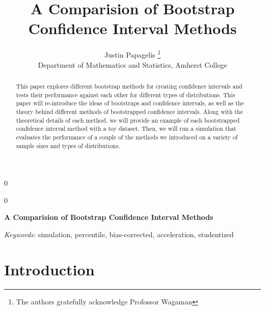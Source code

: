 \documentclass[12pt]{article}
\newcommand{\blind}{0}
\begin{document}
\def\spacingset#1{\renewcommand{\baselinestretch}%
{#1}\small\normalsize} \spacingset{1}



\blind
{
  \title{\bf A Comparision of Bootstrap Confidence Interval Methods}

  \author{
        Justin Papagelis \thanks{The authors gratefully acknowledge
Profossor Wagaman} \\
    Department of Mathematics and Statistics, Amherst College\\
      }
  \maketitle
} \fi

\blind
{
  \bigskip
  \bigskip
  \bigskip
  \begin{center}
    {\LARGE\bf A Comparision of Bootstrap Confidence Interval Methods}
  \end{center}
  \medskip
} \fi

\bigskip
\begin{abstract}
This paper explores different bootstrap methods for creating confidence
intervals and tests their performance against each other for different
types of distributions. This paper will re-introduce the ideas of
bootstraps and confidence intervals, as well as the theory behind
different methods of bootstrapped confidence intervals. Along with the
theoretical details of each method, we will provide an example of each
bootstrapped confidence interval method with a toy dataset. Then, we
will run a simulation that evaluates the performance of a couple of the
methods we introduced on a variety of sample sizes and types of
distributions.
\end{abstract}

\noindent%
{\it Keywords:} simulation, percentile, bias-corrected, acceleration, studentized
\vfill

\newpage
\spacingset{1.45} %

\hypertarget{introduction}{%
\section{Introduction}\label{introduction}}
\end{document}
